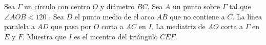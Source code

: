 Sea $\Gamma$ un círculo con centro $O$ y diámetro $BC$. Sea $A$ un punto sobre $\Gamma$ tal que $\angle AOB\lt120^\circ$. Sea $D$ el punto medio de el arco $AB$ que no contiene a $C$. La línea paralela a $AD$ que pasa por $O$ corta a $AC$ en $I$. La mediatriz de $AO$ corta a $\Gamma$ en $E$ y $F$. Muestra que $I$ es el incentro del triángulo $CEF$.